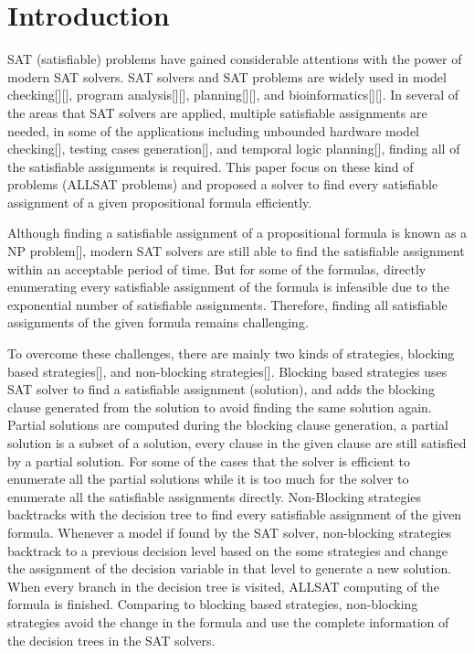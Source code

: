 \section{Introduction}
SAT (satisfiable) problems have gained considerable attentions with the power of modern SAT solvers. SAT solvers and SAT problems are widely used in model checking[][], program analysis[][], planning[][], and bioinformatics[][].
In several of the areas that SAT solvers are applied, multiple satisfiable assignments are needed, in some of the applications including unbounded hardware model checking[], testing cases generation[], and temporal logic planning[], finding all of the satisfiable assignments is required. This paper focus on these kind of problems (ALLSAT problems) and proposed a solver \tool to find every satisfiable assignment of a given propositional formula efficiently.

Although finding a satisfiable assignment of a propositional formula is known as a NP problem[], modern SAT solvers are still able to find the satisfiable assignment within an acceptable period of time. But for some of the formulas, directly enumerating every satisfiable assignment of the formula is infeasible due to the exponential number of satisfiable assignments. Therefore, finding all satisfiable assignments of the given formula remains challenging.

To overcome these challenges, there are mainly two kinds of strategies, blocking based strategies[], and non-blocking strategies[]. Blocking based strategies uses SAT solver to find a satisfiable assignment (solution), and adds the blocking clause generated from the solution to avoid finding the same solution again. Partial solutions are computed during the blocking clause generation, a partial solution is a subset of a solution, every clause in the given clause are still satisfied by a partial solution. For some of the cases that the solver is efficient to enumerate all the partial solutions while it is too much for the solver to enumerate all the satisfiable assignments directly. 
Non-Blocking strategies backtracks with the decision tree to find every satisfiable assignment of the given formula. Whenever a model if found by the SAT solver, non-blocking strategies backtrack to a previous decision level based on the some strategies and change the assignment of the decision variable in that level to generate a new solution. When every branch in the decision tree is visited, ALLSAT computing of the formula is finished. Comparing to blocking based strategies, non-blocking strategies avoid the change in the formula and use the complete information of the decision trees in the SAT solvers. 

